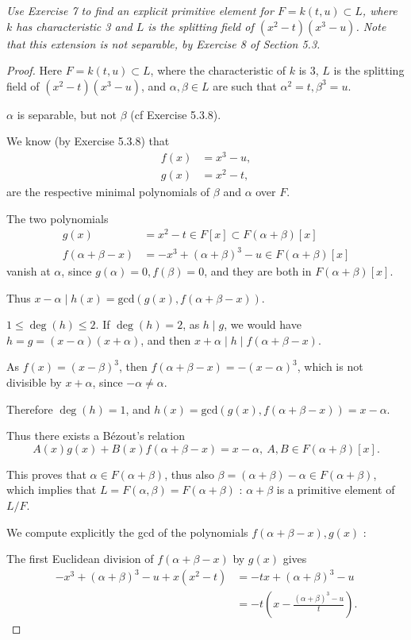 \documentclass[11pt,a4paper]{article}
\begin{document}
{\it Use Exercise 7 to find an explicit primitive element for $F = k(t,u) \subset L$, where $k$ has characteristic 3 and $L$ is the splitting field of $(x^2-t)(x^3-u)$. Note that this extension is not separable, by Exercise 8 of Section 5.3.
}

\begin{proof}
Here $F=k(t,u)\subset L$, where the characteristic of $k$ is 3, $L$ is the splitting field of $(x^2-t)(x^3-u)$, and $\alpha,\beta \in L$ are such that $\alpha^2 = t, \beta^3 = u$.


$\alpha$ is separable, but not $\beta$ (cf Exercise 5.3.8).

We know (by Exercise 5.3.8) that 
\begin{align*}
f(x)&=x^3-u,\\
g(x) &= x^2-t,
\end{align*}
are the respective minimal polynomials of $\beta$ and $\alpha$ over $F$.

The two polynomials 
\begin{align*}
g(x) &= x^2-t \in F[x] \subset F(\alpha+\beta)[x]\\
f(\alpha+\beta-x) &= -x^3 +(\alpha+\beta)^3 - u \in F(\alpha+\beta)[x]
\end{align*}
vanish at $\alpha$, since $g(\alpha) = 0, f(\beta) = 0$, and they are both in ${F(\alpha+\beta)[x]}$.

Thus $x-\alpha \mid h(x) = \mathrm{gcd}(g(x),f(\alpha+\beta -x))$.

$1\leq \deg(h) \leq 2$. If $\deg(h) = 2$, as $h\mid g$, we would have $h=g = (x-\alpha)(x+\alpha)$, and then $x+\alpha  \mid h \mid f(\alpha+\beta-x)$.

As $f(x) = (x-\beta)^3$, then $f(\alpha+\beta-x) = -(x-\alpha)^3$, which is not divisible by $x+\alpha$, since $-\alpha \neq \alpha$.

Therefore $\deg(h) = 1$, and $h(x) =\mathrm{gcd}(g(x),f(\alpha+\beta - x)) = x-\alpha$.

Thus there exists a B\'ezout's relation 
$$A(x) g(x) + B(x) f(\alpha+\beta - x) = x- \alpha, \ A,B \in F(\alpha+\beta)[x].$$

This proves that $\alpha \in F(\alpha+\beta)$, thus also $\beta = (\alpha+ \beta) - \alpha \in F(\alpha+\beta)$, which implies that $L = F(\alpha,\beta) = F(\alpha+\beta)$ : $\alpha+\beta$ is a primitive element of $L/F$.

We compute explicitly the gcd of the polynomials  $f(\alpha+\beta -x), g(x)$  :

The first Euclidean division of $f(\alpha+\beta -x)$ by $g(x)$ gives 
\begin{align*}
-x^3+(\alpha+\beta)^3-u + x(x^2-t) &= -tx +(\alpha+\beta)^3 - u\\
&= -t\left(x-\frac{(\alpha+\beta)^3 - u}{t} \right).
\end{align*}


\end{proof}
\end{document}
